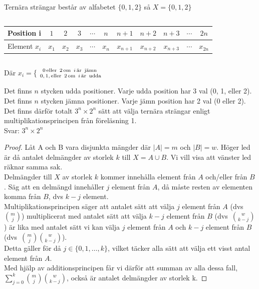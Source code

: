 \documentclass[nobib]{tufte-handout}
\begin{document}
\begin{xca}
Ternära strängar består av alfabetet $\{ 0, 1, 2\}$ så $X=\{ 0, 1, 2\}$

\begin{column}
\begin{tabular}{|c|c|c|c|c|c|c|c|c|c|c|}
\hline
Position i & $1$ & $2$ & $3$ & $\cdots$ & $n$ & $n+1$ & $n+2$ & $n+3$ & $\cdots$ & $2n$  \\
\hline
Element $x_i$ & $x_1$ & $x_2$ & $x_3$ &$\cdots$ & $x_n$ & $x_{n+1}$ & $x_{n+2}$ & $x_{n+3}$ & $\cdots $ & $x_{2n}$ \\
\hline
\end{tabular}
\end{column}
Där $x_i=$\Bigg \{ ${0\, \textrm{eller }\, 2 \, \text{om }\, i \, \textrm{är }\, \textrm{jämn } \atop 0,\, 1,\, \textrm{eller }\, 2\, \textrm{om }\, i\, \textrm{är }\, \textrm{udda}}$

Det finns $n$ stycken udda positioner. Varje udda position har 3 val (0, 1, eller 2).\\
Det finns $n$ stycken jämna positioner. Varje jämn position har 2 val (0 eller 2).\\
Det finns därför totalt $3^n\times 2^n$ sätt att välja ternära strängar enligt multiplikationsprincipen från föreläsning 1.\\
Svar: $3^n\times 2^n$

\end{xca}

\begin{xca}
\begin{proof}
Låt A och B vara disjunkta mängder där $|A|=m$ och $|B|=w$. Höger led är då antalet delmängder av storlek $k$ till $X=A\cup B$. Vi vill visa att vänster led räknar samma sak.\\
Delmängder till $X$ av storlek $k$ kommer innehålla element från $A$ och/eller från $B$. Säg att en delmängd innehåller $j$ element från $A$, då måste resten av elementen komma från $B$, dvs $k-j$ element.\\
Multiplikationsprincipen säger att antalet sätt att välja $j$ element från $A$ (dvs\,$\binom{m}{j}$) multiplicerat med antalet sätt att välja $k-j$ element från $B$ (dvs\, $\binom{w}{k-j}$) är lika med antalet sätt vi kan välja $j$ element från $A$ och $k-j$ element från $B$ (dvs\, $\binom{m}{j} \binom{w}{k-j}$).\\
Detta gäller för då $j\in \{0,1, \ldots , k \}$, vilket täcker alla sätt att välja ett visst antal element från $A$. \\
Med hjälp av additionsprincipen får vi därför att summan av alla dessa fall, $\sum_{j=0}^k \binom{m}{j} \binom{w}{k-j}$, också är antalet delmängder av storlek k.
\end{proof}
\end{xca}


%
%
\end{document}
